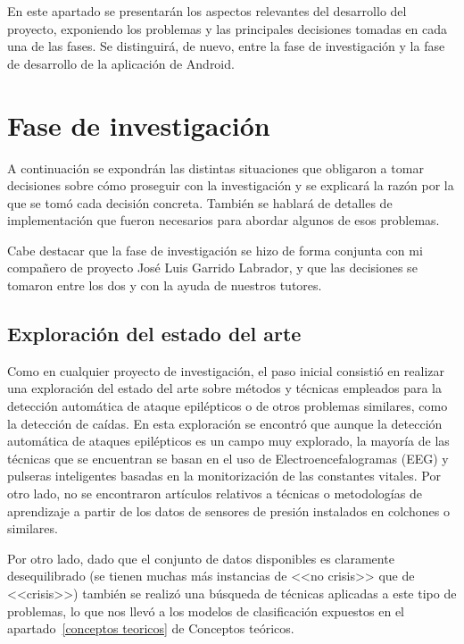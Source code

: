 \label{aspectos relevantes}

En este apartado se presentarán los aspectos relevantes del desarrollo del proyecto, exponiendo los problemas y las principales decisiones tomadas en cada una de las fases. Se distinguirá, de nuevo, entre la fase de investigación y la fase de desarrollo de la aplicación de Android. 

\section{Fase de investigación}

A continuación se expondrán las distintas situaciones que obligaron a tomar decisiones sobre cómo proseguir con la investigación y se explicará la razón por la que se tomó cada decisión concreta. También se hablará de detalles de implementación que fueron necesarios para abordar algunos de esos problemas. 

Cabe destacar que la fase de investigación se hizo de forma conjunta con mi compañero de proyecto José Luis Garrido Labrador, y que las decisiones se tomaron entre los dos y con la ayuda de nuestros tutores. 

\subsection{Exploración del estado del arte}

Como en cualquier proyecto de investigación, el paso inicial consistió en realizar una exploración del estado del arte sobre métodos y técnicas empleados para la detección automática de ataque epilépticos o de otros problemas similares, como la detección de caídas. En esta exploración se encontró que aunque la detección automática de ataques epilépticos es un campo muy explorado, la mayoría de las técnicas que se encuentran se basan en el uso de Electroencefalogramas (EEG) y pulseras inteligentes basadas en la monitorización de las constantes vitales. Por otro lado, no se encontraron artículos relativos a técnicas o metodologías de aprendizaje a partir de los datos de sensores de presión instalados en colchones o similares.

Por otro lado, dado que el conjunto de datos disponibles es claramente desequilibrado (se tienen muchas más instancias de <<no crisis>> que de <<crisis>>) también se realizó una búsqueda de técnicas aplicadas a este tipo de problemas, lo que nos llevó a los modelos de clasificación expuestos en el apartado~\ref{conceptos teoricos} de Conceptos teóricos. 

